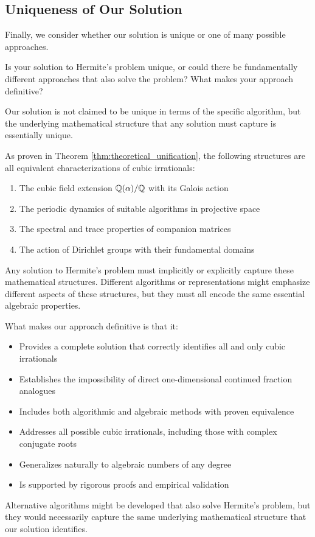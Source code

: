 \subsection{Uniqueness of Our Solution}

Finally, we consider whether our solution is unique or one of many possible approaches.

\begin{objection}
Is your solution to Hermite's problem unique, or could there be fundamentally different approaches that also solve the problem? What makes your approach definitive?
\end{objection}

\begin{response}
Our solution is not claimed to be unique in terms of the specific algorithm, but the underlying mathematical structure that any solution must capture is essentially unique.

As proven in Theorem \ref{thm:theoretical_unification}, the following structures are all equivalent characterizations of cubic irrationals:
\begin{enumerate}
    \item The cubic field extension $\mathbb{Q}(\alpha)/\mathbb{Q}$ with its Galois action
    \item The periodic dynamics of suitable algorithms in projective space
    \item The spectral and trace properties of companion matrices
    \item The action of Dirichlet groups with their fundamental domains
\end{enumerate}

Any solution to Hermite's problem must implicitly or explicitly capture these mathematical structures. Different algorithms or representations might emphasize different aspects of these structures, but they must all encode the same essential algebraic properties.

What makes our approach definitive is that it:
\begin{itemize}
    \item Provides a complete solution that correctly identifies all and only cubic irrationals
    \item Establishes the impossibility of direct one-dimensional continued fraction analogues
    \item Includes both algorithmic and algebraic methods with proven equivalence
    \item Addresses all possible cubic irrationals, including those with complex conjugate roots
    \item Generalizes naturally to algebraic numbers of any degree
    \item Is supported by rigorous proofs and empirical validation
\end{itemize}

Alternative algorithms might be developed that also solve Hermite's problem, but they would necessarily capture the same underlying mathematical structure that our solution identifies.
\end{response}

